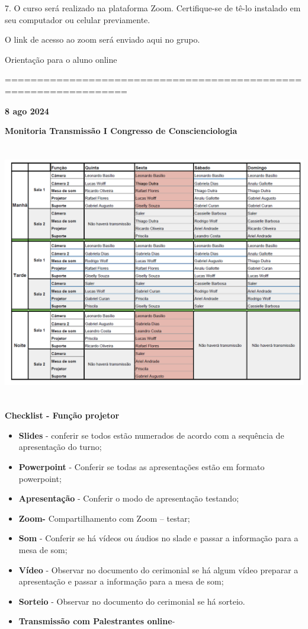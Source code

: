 \documentclass[
]{book}
\begin{document}
7. O curso será realizado na plataforma Zoom. Certifique-se de tê-lo
instalado em seu computador ou celular previamente.

O link de acesso ao zoom será enviado aqui no grupo.

Orientação para o aluno online

=================================================================

\textbf{8 ago 2024}

\textbf{Monitoria Transmissão I Congresso de Conscienciologia}

\includegraphics[width=5.90556in,height=4.4569in]{./media/image1.png}

\textbf{Checklist - Função projetor}

\begin{itemize}
\item
  \textbf{Slides} - conferir se todos estão numerados de acordo com a
  sequência de apresentação do turno;
\item
  \textbf{Powerpoint} - Conferir se todas as apresentações estão em
  formato powerpoint;
\item
  \textbf{Apresentação} - Conferir o modo de apresentação testando;
\item
  \textbf{Zoom-} Compartilhamento com Zoom -- testar;
\item
  \textbf{Som} - Conferir se há vídeos ou áudios no slade e passar a
  informação para a mesa de som;
\item
  \textbf{Vídeo} - Observar no documento do cerimonial se há algum vídeo
  preparar a apresentação e passar a informação para a mesa de som;
\item
  \textbf{Sorteio} - Observar no documento do cerimonial se há sorteio.
\item
  \textbf{Transmissão com Palestrantes online}-
\end{itemize}
\end{document}
